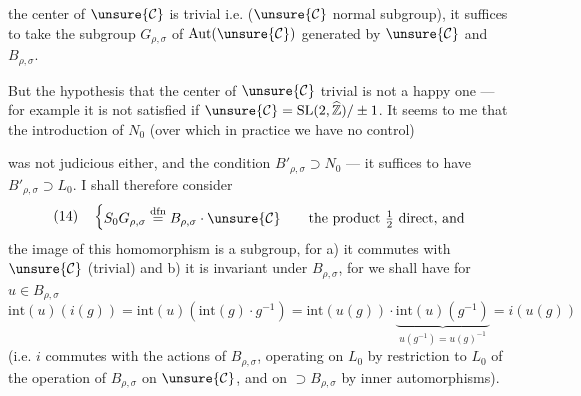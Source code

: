  the center of $\unsure{\mathcal{C}}$ is trivial i.e.
($\unsure{\mathcal{C}}$ normal subgroup),
it suffices to take the subgroup $G_{\rho,\sigma}$ of $\mathrm{Aut}(\unsure{\mathcal{C}})$ generated by $\unsure{\mathcal{C}}$ and $B_{\rho,\sigma}$.

But the hypothesis that the center of $\unsure{\mathcal{C}}$  trivial is not a happy one --- for example it is not satisfied if $\unsure{\mathcal{C}}=\mathrm{SL}(2,\widehat{\mathbb Z})/\pm1$.
It seems to me that the introduction of $N_0$ (over which in practice we have no control)

was not judicious either, and  the condition $B'_{\rho,\sigma}\supset N_0$ --- it suffices to have $B'_{\rho,\sigma}\supset L_0$.
I shall therefore consider
\[
(14)\quad\left\{\begin{gathered}
S_0G_{\rho,\sigma}\overset{\mathrm{dfn}}{=}B_{\rho,\sigma}\cdot\unsure{\mathcal{C}}\qquad\text{the product }\tfrac12\text{ direct, and}
\end{gathered}\right.
\]
the image of this homomorphism is a  subgroup, for a) it commutes with $\unsure{\mathcal{C}}$ (trivial) and b) it is invariant under $B_{\rho,\sigma}$, for we shall have for $u\in B_{\rho,\sigma}$
\[
\mathrm{int}(u)(i(g))=\mathrm{int}(u)(\mathrm{int}(g)\cdot g^{-1})
=\mathrm{int}(u(g))\cdot\underbrace{\mathrm{int}(u)(g^{-1})}_{u(g^{-1})=u(g)^{-1}}
=i(u(g))
\]
(i.e. $i$ commutes with the actions of $B_{\rho,\sigma}$, operating on $L_0$ by restriction to $L_0$ of the  operation of $B_{\rho,\sigma}$ on $\unsure{\mathcal{C}}$, and on  $\supset B_{\rho,\sigma}$ by inner automorphisms).

